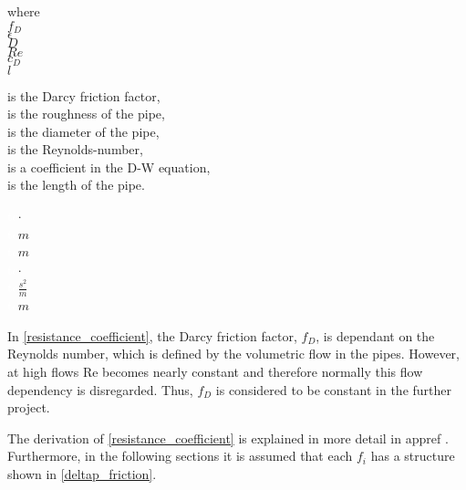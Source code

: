  \begin{minipage}[t]{0.20\textwidth}
where\\
\hspace*{8mm} $f_{D}$ \\
\hspace*{8mm} $\epsilon$ \\
\hspace*{8mm} $D$ \\
\hspace*{8mm} $Re$ \\
\hspace*{8mm} $c_D$ \\
\hspace*{8mm} $l$ 
\end{minipage}
\begin{minipage}[t]{0.68\textwidth}
\vspace*{2mm}
is the Darcy friction factor,  \\
is the roughness of the pipe,  \\
is the diameter of the pipe,  \\
is the Reynolds-number,  \\
is a coefficient in the D-W equation,  \\
is the length of the pipe.
\end{minipage}
\begin{minipage}[t]{0.10\textwidth}
\vspace*{2mm}
\textcolor{White}{te}$\unit{\cdot}$\\
\textcolor{White}{te}$\unit{m}$\\
\textcolor{White}{te}$\unit{m}$ \\
\textcolor{White}{te}$\unit{\cdot}$ \\
\textcolor{White}{te}$\unit{\frac{s^2}{m}}$ \\
\textcolor{White}{te}$\unit{m}$
\end{minipage}

In \eqref{resistance_coefficient}, the Darcy friction factor, $f_D$, is dependant on the Reynolds number, which is defined by the volumetric flow in the pipes. However, at high flows Re becomes nearly constant and therefore normally this flow dependency is disregarded. Thus, $f_D$ is considered to be constant in the further project. 

The derivation of \eqref{resistance_coefficient} is explained in more detail in appref \cite{chen2016sustainable}. Furthermore, in the following sections it is assumed that each $f_i$ has a structure shown in \eqref{deltap_friction}.

